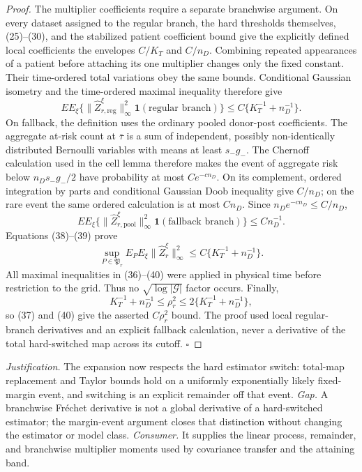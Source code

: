 \documentclass{article}
\begin{document}
\begin{proof}
The multiplier coefficients require a separate branchwise argument.  On
every dataset assigned to the regular branch, the hard thresholds themselves,
(25)--(30), and the stabilized patient coefficient bound give the explicitly
defined local coefficients the envelopes \(C/K_T\) and \(C/n_D\).  Combining
repeated appearances of a patient before attaching its one multiplier changes
only the fixed constant.  Their time-ordered total variations obey the same
bounds.  Conditional Gaussian isometry and the time-ordered maximal inequality
therefore give
\[
 E E_\xi\{\|\widehat Z_{r,\mathrm{reg}}^\xi\|_\infty^2
 \mathbf1(\text{regular branch})\}
 \leq C\{K_T^{-1}+n_D^{-1}\}.                          \tag{38}
\]
On fallback, the definition uses the ordinary pooled donor-post coefficients.
The aggregate at-risk count at \(\bar\tau\) is a sum of independent, possibly
non-identically distributed Bernoulli variables with means at least
\(s_-g_-\).  The Chernoff calculation used in the cell lemma therefore makes
the event of aggregate risk below \(n_Ds_-g_-/2\) have probability at most
\(Ce^{-cn_D}\).  On its complement, ordered integration by parts and
conditional Gaussian Doob inequality give \(C/n_D\); on the rare event the
same ordered calculation is at most \(Cn_D\).  Since
\(n_De^{-cn_D}\leq C/n_D\),
\[
 E E_\xi\{\|\widehat Z_{r,\mathrm{pool}}^\xi\|_\infty^2
 \mathbf1(\text{fallback branch})\}\leq Cn_D^{-1}.     \tag{39}
\]
Equations (38)--(39) prove
\[
 \sup_{P\in\mathfrak P_r}E_PE_\xi
 \|\widehat Z_r^\xi\|_\infty^2
 \leq C\{K_T^{-1}+n_D^{-1}\}.                         \tag{40}
\]
All maximal inequalities in (36)--(40) were applied in physical time before
restriction to the grid.  Thus no \(\sqrt{\log|\mathcal G|}\) factor occurs.
Finally,
\[
 K_T^{-1}+n_D^{-1}\leq\rho_r^2
 \leq2\{K_T^{-1}+n_D^{-1}\},
\]
so (37) and (40) give the asserted \(C\rho_r^2\) bound.  The proof used local
regular-branch derivatives and an explicit fallback calculation, never a
derivative of the total hard-switched map across its cutoff. \(\square\)
\end{proof}
\par\smallskip\noindent \textit{Justification.} The expansion now respects the hard estimator switch: total-map replacement and Taylor bounds hold on a uniformly exponentially likely fixed-margin event, and switching is an explicit remainder off that event. \textit{Gap.} A branchwise Fréchet derivative is not a global derivative of a hard-switched estimator; the margin-event argument closes that distinction without changing the estimator or model class. \textit{Consumer.} It supplies the linear process, remainder, and branchwise multiplier moments used by covariance transfer and the attaining band.
\end{document}

